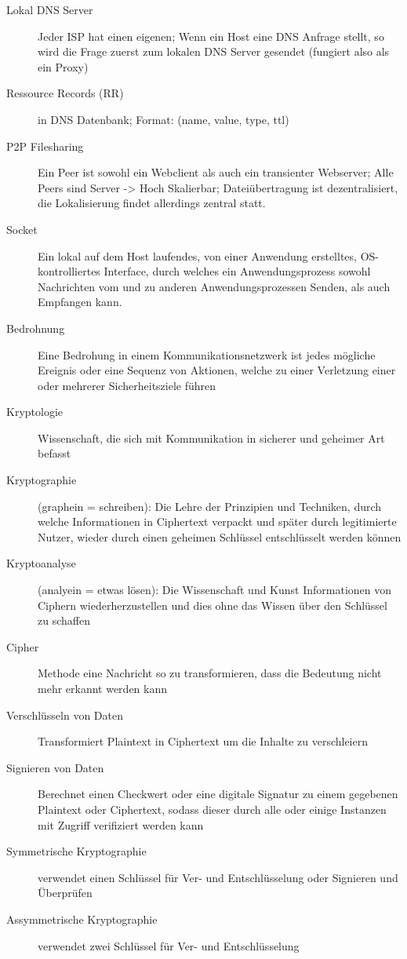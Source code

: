 \documentclass[10pt,landscape]{article}
\begin{document}
\begin{multicols}{3}
\begin{description}
    \item[Lokal DNS Server] Jeder ISP hat einen eigenen; Wenn ein Host eine DNS Anfrage stellt, so wird die Frage zuerst zum lokalen DNS Server gesendet (fungiert also als ein Proxy)
    \item[Ressource Records (RR)] in DNS Datenbank; Format: (name, value, type, ttl)
    \item[P2P Filesharing] Ein Peer ist sowohl ein Webclient als auch ein transienter Webserver; Alle Peers sind Server -> Hoch Skalierbar; Dateiübertragung ist dezentralisiert, die Lokalisierung findet allerdings zentral statt.
    \item[Socket] Ein lokal auf dem Host laufendes, von einer Anwendung erstelltes, OS-kontrolliertes Interface, durch welches ein Anwendungsprozess sowohl Nachrichten vom und zu anderen Anwendungsprozessen Senden, als auch Empfangen kann.
    \item[Bedrohnung] Eine Bedrohung in einem Kommunikationsnetzwerk ist jedes mögliche Ereignis oder eine Sequenz von Aktionen, welche zu einer Verletzung einer oder mehrerer Sicherheitsziele führen
    \item[Kryptologie] Wissenschaft, die sich mit Kommunikation in sicherer und geheimer Art befasst
    \item[Kryptographie] (graphein = schreiben): Die Lehre der Prinzipien und Techniken, durch welche Informationen in Ciphertext verpackt und später durch legitimierte Nutzer, wieder durch einen geheimen Schlüssel entschlüsselt werden können
    \item[Kryptoanalyse] (analyein = etwas lösen): Die Wissenschaft und Kunst Informationen von Ciphern wiederherzustellen und dies ohne das Wissen über den Schlüssel zu schaffen
    \item[Cipher] Methode eine Nachricht so zu transformieren, dass die Bedeutung nicht mehr erkannt werden kann
    \item[Verschlüsseln von Daten] Transformiert Plaintext in Ciphertext um die Inhalte zu verschleiern
    \item[Signieren von Daten] Berechnet einen Checkwert oder eine digitale Signatur zu einem gegebenen Plaintext oder Ciphertext, sodass dieser durch alle oder einige Instanzen mit Zugriff verifiziert werden kann
    \item[Symmetrische Kryptographie] verwendet einen Schlüssel für Ver- und Entschlüsselung oder Signieren und Überprüfen
    \item[Assymmetrische Kryptographie] verwendet zwei Schlüssel für Ver- und Entschlüsselung

\end{description}
\end{multicols}
\end{document}
